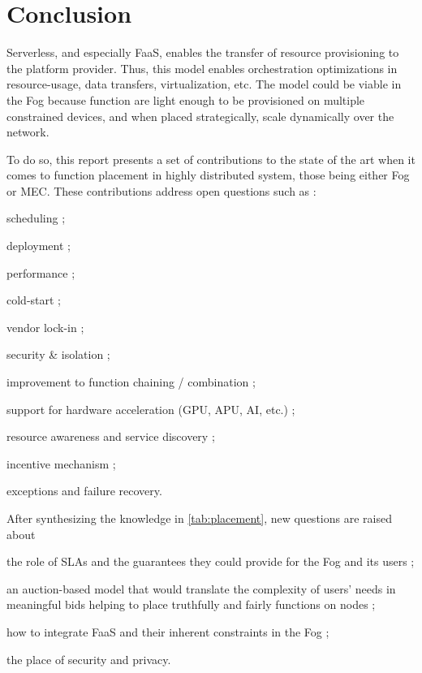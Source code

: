 \documentclass[11pt]{sdm}
\begin{document}



\section{Conclusion}

Serverless, and especially \gls{FaaS}, enables the transfer of resource provisioning to the platform provider. Thus, this model enables orchestration optimizations in resource-usage, data transfers, virtualization, etc. The model could be viable in the Fog because function are light enough to be provisioned on  multiple constrained devices, and when placed strategically, scale dynamically over the network.

To do so, this report presents a set of contributions to the state of the art when it comes to function placement in highly distributed system, those being either Fog or \gls{MEC}. These contributions address open questions such as \cite{kjorveziroski_iot_2021,xie_when_2021}:
\begin{enumerate*}[(a)]
	\item scheduling ;
	\item deployment ;
	\item performance ;
	\item cold-start ;
	\item vendor lock-in ;
	\item security \& isolation ;
	\item improvement to function chaining / combination ;
	\item support for hardware acceleration (\gls{GPU}, \gls{APU}, \gls{AI}, etc.) ;
	\item resource awareness and service discovery ;
	\item incentive mechanism ;
	\item exceptions and failure recovery.
\end{enumerate*}
After synthesizing the knowledge in \cref{tab:placement}, new questions are raised about
\begin{enumerate*}[(i)]
	\item the role of \glspl{SLA} and the guarantees they could provide for the Fog and its users ;
	\item an auction-based model that would translate the complexity of users' needs in meaningful bids helping to place truthfully and fairly functions on nodes ;
	\item how to integrate \gls{FaaS} and their inherent constraints in the Fog ;
	\item the place of security and privacy.
\end{enumerate*}
\printbibliography
\end{document}
